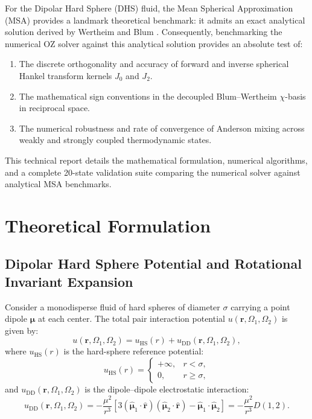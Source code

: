 \documentclass[11pt,a4paper]{article}
\begin{document}
For the Dipolar Hard Sphere (DHS) fluid, the Mean Spherical Approximation (MSA) provides a landmark theoretical benchmark: it admits an exact analytical solution derived by Wertheim \cite{wertheim1971exact} and Blum \cite{blum1972mean, blum1973mean}. Consequently, benchmarking the numerical OZ solver against this analytical solution provides an absolute test of:
\begin{enumerate}
    \item The discrete orthogonality and accuracy of forward and inverse spherical Hankel transform kernels $J_0$ and $J_2$.
    \item The mathematical sign conventions in the decoupled Blum--Wertheim $\chi$-basis in reciprocal space.
    \item The numerical robustness and rate of convergence of Anderson mixing across weakly and strongly coupled thermodynamic states.
\end{enumerate}

This technical report details the mathematical formulation, numerical algorithms, and a complete 20-state validation suite comparing the numerical solver against analytical MSA benchmarks.

\section{Theoretical Formulation}

\subsection{Dipolar Hard Sphere Potential and Rotational Invariant Expansion}

Consider a monodisperse fluid of hard spheres of diameter $\sigma$ carrying a point dipole $\bm{\mu}$ at each center. The total pair interaction potential $u(\mathbf{r}, \Omega_1, \Omega_2)$ is given by:
\begin{equation}
    u(\mathbf{r}, \Omega_1, \Omega_2) = u_{\text{HS}}(r) + u_{\text{DD}}(\mathbf{r}, \Omega_1, \Omega_2),
\end{equation}
where $u_{\text{HS}}(r)$ is the hard-sphere reference potential:
\begin{equation}
    u_{\text{HS}}(r) = \begin{cases} 
    +\infty, & r < \sigma, \\ 
    0, & r \ge \sigma, 
    \end{cases}
\end{equation}
and $u_{\text{DD}}(\mathbf{r}, \Omega_1, \Omega_2)$ is the dipole--dipole electrostatic interaction:
\begin{equation}
    u_{\text{DD}}(\mathbf{r}, \Omega_1, \Omega_2) = -\frac{\mu^2}{r^3} \left[ 3(\hat{\bm{\mu}}_1 \cdot \hat{\mathbf{r}})(\hat{\bm{\mu}}_2 \cdot \hat{\mathbf{r}}) - \hat{\bm{\mu}}_1 \cdot \hat{\bm{\mu}}_2 \right] = -\frac{\mu^2}{r^3} D(1,2).
\end{equation}
\end{document}
